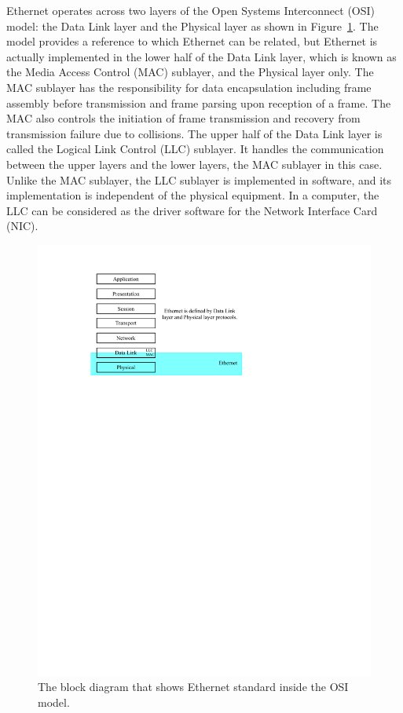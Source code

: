 \documentclass[11pt, twoside, pdftex]{article}
\begin{document}
Ethernet operates across two layers of the Open Systems Interconnect (OSI) model: the Data Link layer and the Physical layer as shown in Figure~\ref{fig:osi_model}. The model provides a reference to which Ethernet can be related, but Ethernet is actually implemented in the lower half of the Data Link layer, which is known as the Media Access Control (MAC) sublayer, and the Physical layer only. The MAC sublayer has the responsibility for data encapsulation including frame assembly before transmission and frame parsing upon reception of a frame. The MAC also controls the initiation of frame transmission and recovery from transmission failure due to collisions. The upper half of the Data Link layer is called the Logical Link Control (LLC) sublayer. It handles the communication between the upper layers and the lower layers, the MAC sublayer in this case. Unlike the MAC sublayer, the LLC sublayer is implemented in software, and its implementation is independent of the physical equipment. In a computer, the LLC can be considered as the driver software for the Network Interface Card (NIC).


\begin{figure}[H]
	\centering
	  \includegraphics[scale=1]{figures/osi_ethernet_diagram.pdf}
	\caption{The block diagram that shows Ethernet standard inside the OSI model.} 
	\label{fig:osi_model}
\end{figure}
\end{document}
